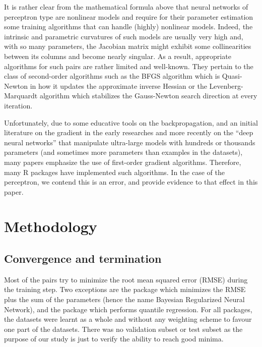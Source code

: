 It is rather clear from the mathematical formula above that neural
networks of perceptron type are nonlinear models and require for their
parameter estimation some training algorithms that can handle (highly)
nonlinear models. Indeed, the intrinsic and parametric curvatures of
such models are usually very high and, with so many parameters, the
Jacobian matrix might exhibit some collinearities between its columns
and become nearly singular. As a result, appropriate algorithms for such
 pairs are rather limited and well-known. They
pertain to the class of second-order algorithms such as the BFGS
algorithm which is Quasi-Newton in how it updates the approximate
inverse Hessian or the Levenberg-Marquardt algorithm which stabilizes
the Gauss-Newton search direction at every iteration.

Unfortunately, due to some educative tools on the backpropagation, and
an initial literature on the gradient in the early researches and more
recently on the ``deep neural networks'' that manipulate ultra-large
models with hundreds or thousands parameters (and sometimes more
parameters than examples in the datasets), many papers emphasize the use
of first-order gradient algorithms. Therefore, many \textsf{R} packages
have implemented such algorithms. In the case of the perceptron, we
contend this is an error, and provide evidence to that effect in this
paper.

\hypertarget{methodology}{%
\section{Methodology}\label{methodology}}

\hypertarget{convergence-and-termination}{%
\subsection{Convergence and
termination}\label{convergence-and-termination}}

Most of the  pairs try to minimize the root mean
squared error (RMSE) during the training step. Two exceptions are the
 package which minimizes the RMSE plus the sum of the
parameters (hence the name Bayesian Regularized Neural Network), and the
 package which performs quantile regression. For all
packages, the datasets were learnt as a whole and without any weighting
scheme to favour one part of the datasets. There was no validation
subset or test subset as the purpose of our study is just to verify the
ability to reach good minima.

